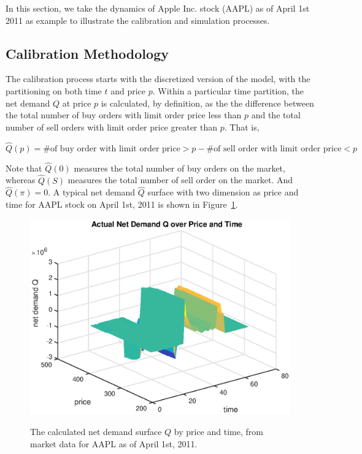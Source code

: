 \documentclass{article}
\begin{document}
In this section, we take the dynamics of Apple Inc. stock (AAPL) as of April 1st 2011 as example to illustrate the calibration and simulation processes.

\subsection{Calibration Methodology}
The calibration process starts with the discretized version of the model, with the partitioning on both time $t$ and price $p$. Within a particular time partition, the net demand $Q$ at price $p$ is calculated, by definition, as the the difference between the total number of buy orders with limit order price less than $p$ and the total number of sell orders with limit order price greater than $p$. That is,

$$
\hat{Q}(p) = \# \textrm{of buy order with limit order price} > p - \# \textrm{of sell order with limit order price} < p
$$

Note that $\hat{Q}(0)$ measures the total number of buy orders on the market, whereas $\hat{Q}(S)$ measures the total number of sell order on the market. And $\hat{Q}(\pi) = 0$. A typical net demand $\hat{Q}$ surface with two dimension as price and time for AAPL stock on April 1st, 2011 is shown in Figure~\ref{fig::AAPL_20110401_Calibration_Q}.

\begin{center}
\begin{figure}
  \centering
  \includegraphics[scale = 0.7]{AAPL_20110401_Calibration_Q.eps}\\
  \caption{The calculated net demand surface $Q$ by price and time, from market data for AAPL as of April 1st, 2011.}\label{fig::AAPL_20110401_Calibration_Q}
\end{figure}
\end{center}
\end{document}
